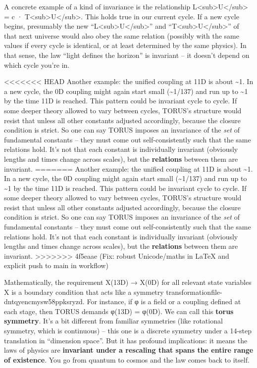 \documentclass[]{article}
\begin{document}
A concrete example of a kind of invariance is the relationship
L\textless{}sub\textgreater{}U\textless{}/sub\textgreater{} = c ·
T\textless{}sub\textgreater{}U\textless{}/sub\textgreater{}. This holds
true in our current cycle. If a new cycle begins, presumably the new
``L\textless{}sub\textgreater{}U\textless{}/sub\textgreater{}'' and
``T\textless{}sub\textgreater{}U\textless{}/sub\textgreater{}'' of that
next universe would also obey the same relation (possibly with the same
values if every cycle is identical, or at least determined by the same
physics). In that sense, the law ``light defines the horizon'' is
invariant -- it doesn't depend on which cycle you're in.

<<<<<<< HEAD
Another example: the unified coupling at 11D is about \textasciitilde1.
In a new cycle, the 0D coupling might again start small
(\textasciitilde1/137) and run up to \textasciitilde1 by the time 11D is
reached. This pattern could be invariant cycle to cycle. If some deeper
theory allowed \alpha to vary between cycles, TORUS's structure would resist
that unless all other constants adjusted accordingly, because the
closure condition is strict. So one can say TORUS imposes an invariance
of the \emph{set} of fundamental constants -- they must come out
self-consistently such that the same relations hold. It's not that each
constant is individually invariant (obviously lengths and times change
across scales), but the \textbf{relations} between them are invariant.
=======
Another example: the unified coupling at 11D is about
\textasciitilde{}1. In a new cycle, the 0D coupling might again start
small (\textasciitilde{}1/137) and run up to \textasciitilde{}1 by the
time 11D is reached. This pattern could be invariant cycle to cycle. If
some deeper theory allowed \alpha to vary between cycles, TORUS's structure
would resist that unless all other constants adjusted accordingly,
because the closure condition is strict. So one can say TORUS imposes an
invariance of the \emph{set} of fundamental constants -- they must come
out self-consistently such that the same relations hold. It's not that
each constant is individually invariant (obviously lengths and times
change across scales), but the \textbf{relations} between them are
invariant.
>>>>>>> 4f5eaae (Fix: robust Unicode/maths in LaTeX and explicit push to main in workflow)

Mathematically, the requirement X(13D) → X(0D) for all relevant state
variables X is a boundary condition that acts like a symmetry
transformation​file-dntqyencmysw58ppksryzd. For instance, if φ is a
field or a coupling defined at each stage, then TORUS demands φ(13D) =
φ(0D). We can call this \textbf{torus symmetry}. It's a bit different
from familiar symmetries (like rotational symmetry, which is continuous)
-- this one is a discrete symmetry under a 14-step translation in
``dimension space''. But it has profound implications: it means the laws
of physics are \textbf{invariant under a rescaling that spans the entire
range of existence}. You go from quantum to cosmos and the law comes
back to itself.
\end{document}

